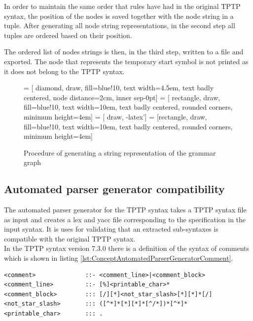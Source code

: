 In order to maintain the same order that rules have had in the original \ac{TPTP} syntax, the position of the nodes is saved together with the node string in a tuple. 
After generating all node string representations, in the second step all tuples are ordered based on their position. 

The ordered list of nodes strings is then, in the third step, written to a file and exported.
The node that represents the temporary start symbol is not printed as it does not belong to the \ac{TPTP} syntax. 
 
\begin{figure}[H]
 = [ diamond, draw, fill=blue!10, text width=4.5em, text badly centered, node distance=2cm, inner sep-0pt]  
 = [ rectangle, draw, fill=blue!10, text width=10em, text badly centered, rounded corners, minimum height=4em]  
 = [ draw, -latex']  
 = [rectangle, draw, fill=blue!10, text width=10em, text badly centered, rounded corners, minimum height=4em]  
\begin{center}
\end{center}
\caption{Procedure of generating a string representation of the grammar graph}
\label{fig:ConceptOutputGrammarGraphProcedure}
\end{figure}

\subsection{Automated parser generator compatibility}\label{sec:ConceptAutomatedParserGenerator}

The automated parser generator for the \ac{TPTP} syntax \cite{VS06} takes a \ac{TPTP} syntax file as input and creates a lex and yacc file corresponding to the specification in the input syntax. It is uses for validating that an extracted sub-syntaxes is compatible with the original \ac{TPTP} syntax.\\
In the \ac{TPTP} syntax version 7.3.0 there is a definition of the syntax of comments which is shown in listing \ref{lst:ConceptAutomatedParserGeneratorComment}.
\begin{lstlisting}[language=none, basicstyle=\scriptsize, caption=Comment syntax definition in the \ac{TPTP} syntax, label= lst:ConceptAutomatedParserGeneratorComment]
<comment>              ::- <comment_line>|<comment_block> 
<comment_line>         ::- [%]<printable_char>*
<comment_block>        ::: [/][*]<not_star_slash>[*][*]*[/]
<not_star_slash>       ::: ([^*]*[*][*]*[^/*])*[^*]*
<printable_char>       ::: .
\end{lstlisting}

